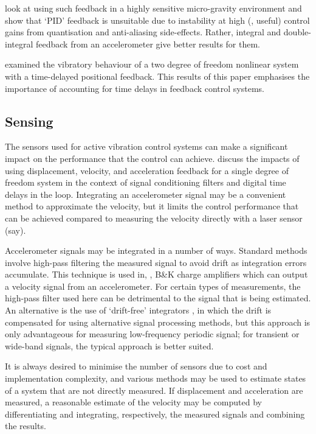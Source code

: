 \textcite{zhu2006} look at using such feedback in a highly sensitive
micro-gravity environment and show that `PID' feedback is unsuitable due to
instability at high (\ie, useful) control gains from quantisation and
anti-aliasing side-effects. Rather, integral and double-integral feedback from
an accelerometer give better results for them.

\textcite{zhao2007} examined the vibratory behaviour of a two degree of
freedom nonlinear system with a time-delayed positional feedback. This results
of this paper emphasises the importance of accounting for time delays in
feedback control systems.

\subsection{Sensing}

The sensors used for active vibration control systems can make a
significant impact on the performance that the control can
achieve. \textcite{brennan2007} discuss the impacts of using
displacement, velocity, and acceleration feedback for a single degree
of freedom system in the context of signal conditioning filters and
digital time delays in the loop. Integrating an accelerometer signal
may be a convenient method to approximate the velocity, but it limits
the control performance that can be achieved compared to measuring the
velocity directly with a laser sensor (say).

Accelerometer signals may be integrated in a number of ways. Standard methods
involve high-pass filtering the measured signal to avoid drift as integration
errors accumulate. This technique is used in, \eg, B\&K charge amplifiers
which can output a velocity signal from an accelerometer. For certain types of
measurements, the high-pass filter used here can be detrimental to the signal
that is being estimated. An alternative is the use of `drift-free' integrators
\cite{gavin1998}, in which the drift is compensated for using alternative
signal processing methods, but this approach is only advantageous for
measuring low-frequency periodic signal; for transient or wide-band signals,
the typical approach is better suited.

It is always desired to minimise the number of sensors due to cost and
implementation complexity, and various methods may be used to estimate
states of a system that are not directly measured. If displacement and
acceleration are measured, a reasonable estimate of the velocity may
be computed by differentiating and integrating, respectively, the
measured signals and combining the results.


